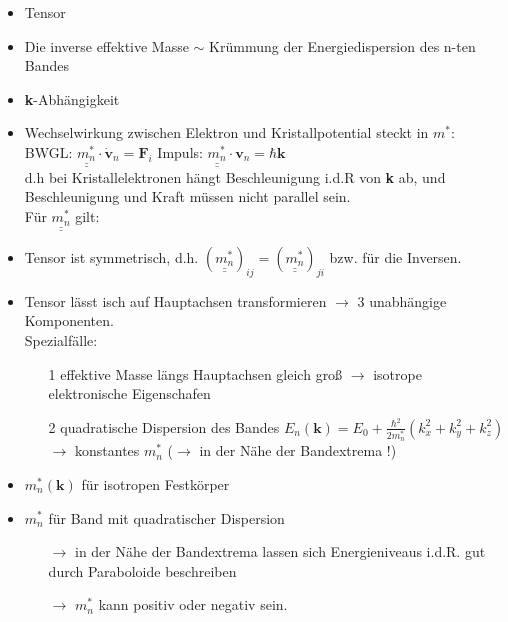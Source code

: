 \begin{itemize}
          \begin{itemize}
              \item Tensor
              \item Die inverse effektive Masse $\sim$ Krümmung der Energiedispersion des n-ten Bandes
              \item \textbf{k}-Abhängigkeit
              \item Wechselwirkung zwischen Elektron und Kristallpotential steckt in $m^*$: \\
                    BWGL: $\underline{\underline{m_n^*}} \cdot \dot{\textbf{v}}_n = \textbf{F}_i$ Impuls: $\underline{\underline{m_n^*}} \cdot \textbf{v}_n = \hbar \textbf{k}$ \\
                    d.h bei Kristallelektronen hängt Beschleunigung i.d.R von \textbf{k} ab, und Beschleunigung und Kraft müssen nicht parallel sein. \\
                    Für $\underline{\underline{m_n^*}}$ gilt: \\
              \item Tensor ist symmetrisch, d.h. $(\underline{\underline{m_n^*}})_{ij} = (\underline{\underline{m_n^*}})_{ji}$ bzw. für die Inversen.
              \item Tensor lässt isch auf Hauptachsen transformieren $\rightarrow$ 3 unabhängige Komponenten.\\
                    Spezialfälle:
                    \begin{itemize}
                        \item[1] effektive Masse längs Hauptachsen gleich groß $\rightarrow$ isotrope elektronische Eigenschafen
                        \item[2] quadratische Dispersion des Bandes $E_n(\textbf{k}) = E_0 + \frac{\hbar^2}{2m_n^*}(k_x^2 + k_y^2 + k_z^2)$ $\rightarrow$  konstantes $m_n^*$ ($\rightarrow$  in der Nähe der Bandextrema !)
                    \end{itemize}
              \item $m_n^* (\textbf{k})$ für isotropen Festkörper
              \item $m_n^*$ für Band mit quadratischer Dispersion
                    \begin{itemize}
                        \item[$\rightarrow$] in der Nähe der Bandextrema lassen sich Energieniveaus i.d.R. gut durch Paraboloide beschreiben
                        \item[$\rightarrow$] $m_n^*$ kann positiv oder negativ sein.
                    \end{itemize}
          \end{itemize}
\end{itemize}



